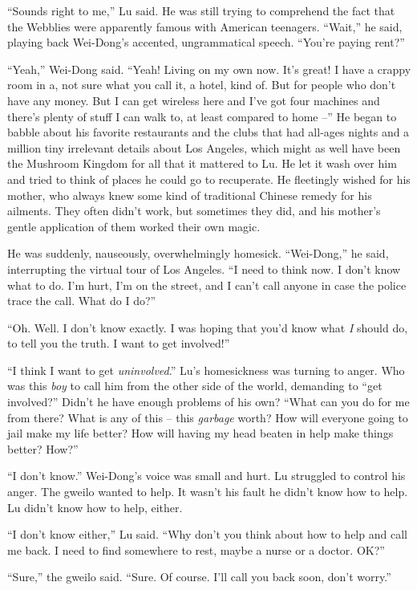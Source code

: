 ``Sounds right to me,'' Lu said. He was still trying to comprehend
the fact that the Webblies were apparently famous with American
teenagers. ``Wait,'' he said, playing back Wei-Dong's accented,
ungrammatical speech. ``You're paying rent?''

``Yeah,'' Wei-Dong said. ``Yeah! Living on my own now. It's great! I
have a crappy room in a, not sure what you call it, a hotel, kind
of. But for people who don't have any money. But I can get wireless
here and I've got four machines and there's plenty of stuff I can
walk to, at least compared to home --'' He began to babble about his
favorite restaurants and the clubs that had all-ages nights and a
million tiny irrelevant details about Los Angeles, which might as
well have been the Mushroom Kingdom for all that it mattered to Lu.
He let it wash over him and tried to think of places he could go to
recuperate. He fleetingly wished for his mother, who always knew
some kind of traditional Chinese remedy for his ailments. They
often didn't work, but sometimes they did, and his mother's gentle
application of them worked their own magic.

He was suddenly, nauseously, overwhelmingly homesick. ``Wei-Dong,''
he said, interrupting the virtual tour of Los Angeles. ``I need to
think now. I don't know what to do. I'm hurt, I'm on the street,
and I can't call anyone in case the police trace the call. What do
I do?''

``Oh. Well. I don't know exactly. I was hoping that you'd know what
\emph{I} should do, to tell you the truth. I want to get
involved!''

``I think I want to get \emph{uninvolved}.'' Lu's homesickness was
turning to anger. Who was this \emph{boy} to call him from the
other side of the world, demanding to ``get involved?'' Didn't he
have enough problems of his own? ``What can you do for me from
there? What is any of this -- this \emph{garbage} worth? How will
everyone going to jail make my life better? How will having my head
beaten in help make things better? How?''

``I don't know.'' Wei-Dong's voice was small and hurt. Lu struggled
to control his anger. The gweilo wanted to help. It wasn't his
fault he didn't know how to help. Lu didn't know how to help,
either.

``I don't know either,'' Lu said. ``Why don't you think about how to
help and call me back. I need to find somewhere to rest, maybe a
nurse or a doctor. OK?''

``Sure,'' the gweilo said. ``Sure. Of course. I'll call you back soon,
don't worry.''

